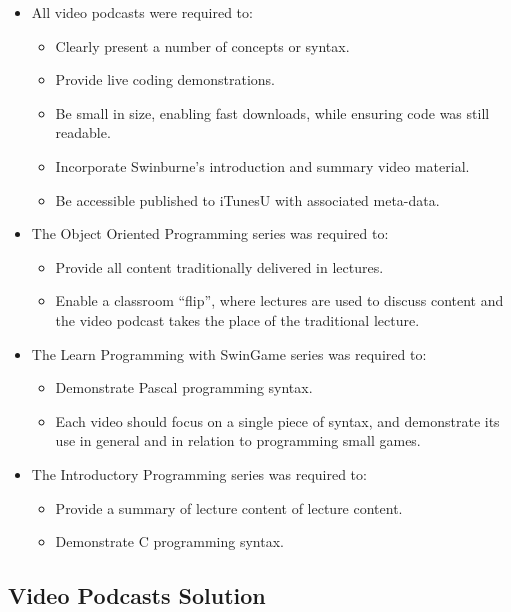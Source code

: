 \begin{itemize}[noitemsep,nolistsep]
  \item All video podcasts were required to:
  \begin{itemize}[noitemsep,nolistsep]
    \item Clearly present a number of concepts or syntax.
    \item Provide live coding demonstrations.
    \item Be small in size, enabling fast downloads, while ensuring code was still readable.
    \item Incorporate Swinburne's introduction and summary video material.
    \item Be accessible published to iTunesU with associated meta-data.
  \end{itemize}
  \item The Object Oriented Programming series was required to:
  \begin{itemize}[noitemsep,nolistsep]
    \item Provide all content traditionally delivered in lectures.
    \item Enable a classroom ``flip'', where lectures are used to discuss content and the video podcast takes the place of the traditional lecture.
  \end{itemize}
  \item The Learn Programming with SwinGame series was required to:
  \begin{itemize}[noitemsep,nolistsep]
    \item Demonstrate Pascal programming syntax.
    \item Each video should focus on a single piece of syntax, and demonstrate its use in general and in relation to programming small games.
  \end{itemize}
  \item The Introductory Programming series was required to:
  \begin{itemize}[noitemsep,nolistsep]
    \item Provide a summary of lecture content of lecture content.
    \item Demonstrate C programming syntax.
  \end{itemize}
\end{itemize}


\subsection{Video Podcasts Solution} %
\label{sub:video_podcasts_solution}


